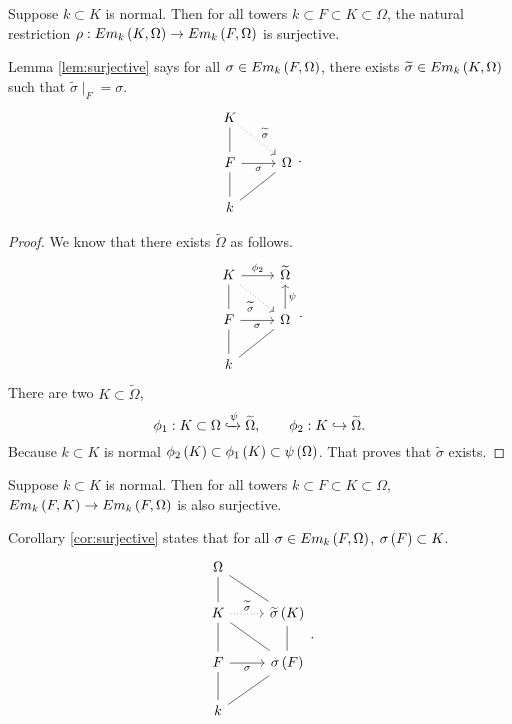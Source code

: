 \begin{lemma}
\label{lem:surjective}
Suppose $ k \subset K $ is normal. Then for all towers $ k \subset F \subset K \subset \Omega $, the natural restriction $ \rho : Em_k\left( K, \Omega \right) \to Em_k\left( F, \Omega \right) $ is surjective.
\end{lemma}


Lemma \ref{lem:surjective} says for all $ \sigma \in Em_k\left( F, \Omega \right) $, there exists $ \widetilde{\sigma} \in Em_k\left( K, \Omega \right) $ such that $ \widetilde{\sigma} \mid_F = \sigma $.
$$
\begin{tikzcd}
K \arrow[dotted]{dr}{\widetilde{\sigma}} & \\
F \arrow[dash]{u} \arrow[swap]{r}{\sigma} & \Omega \\
k \arrow[dash]{u} \arrow[dash]{ur} &
\end{tikzcd}.
$$

\begin{proof}
We know that there exists $ \widetilde{\Omega} $ as follows.
$$
\begin{tikzcd}
K \arrow{r}{\phi_2} \arrow[dotted, swap]{dr}{\widetilde{\sigma}} & \widetilde{\Omega} \\
F \arrow[dash]{u} \arrow[swap]{r}{\sigma} & \Omega \arrow[swap]{u}{\psi} \\
k \arrow[dash]{u} \arrow[dash]{ur} &
\end{tikzcd}.
$$
There are two $ K \subset \widetilde{\Omega} $,
$$
\phi_1 : K \subset \Omega \xhookrightarrow{\psi} \widetilde{\Omega}, \qquad \phi_2 : K \hookrightarrow \widetilde{\Omega}.
$$
Because $ k \subset K $ is normal $ \phi_2\left( K \right) \subset \phi_1\left( K \right) \subset \psi\left( \Omega \right) $. That proves that $ \widetilde{\sigma} $ exists.
\end{proof}

\begin{corollary}
\label{cor:surjective}
Suppose $ k \subset K $ is normal. Then for all towers $ k \subset F \subset K \subset \Omega $, $ Em_k\left( F, K \right) \to Em_k\left( F, \Omega \right) $ is also surjective.
\end{corollary}

Corollary \ref{cor:surjective} states that for all $ \sigma \in Em_k\left( F, \Omega \right) $, $ \sigma\left( F \right) \subset K $.
$$
\begin{tikzcd}
\Omega & \\
K \arrow[dash]{u} \arrow[dotted]{r}{\widetilde{\sigma}} & \widetilde{\sigma}\rb{K} \arrow[dash]{ul} \\
F \arrow[dash]{u} \arrow[swap]{r}{\sigma} & \sigma\rb{F} \arrow[dash]{ul} \arrow[dash]{u} \\
k \arrow[dash]{u} \arrow[dash]{ur} &
\end{tikzcd}.
$$

